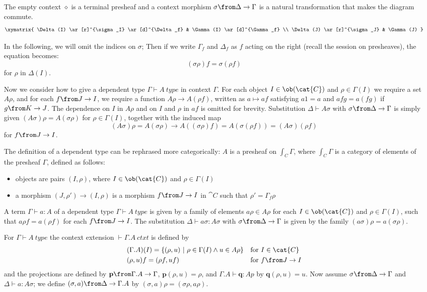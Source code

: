 The empty context $\diamond$ is a terminal presheaf and a context morphism
$\sigma \from \Delta \to \Gamma$ is a natural transformation that makes the
diagram commute.
\[
  \xymatrix{
    \Delta(I) \ar[r]^{\sigma_I} \ar[d]^{\Delta_f} & \Gamma(I) \ar[d]^{\Gamma_f} \\
    \Delta(J) \ar[r]^{\sigma_J} & \Gamma(J)
  }
\]

In the following, we will omit the indices on $\sigma$; Then if we write
$\Gamma_f$ and $\Delta_f$ as $f$ acting on the right (recall the session on
presheaves), the equation becomes:
\[
  (\sigma \rho) f = \sigma (\rho f)
\]
for $\rho$ in $\Delta(I)$.

Now we consider how to give a dependent type $\Gamma \vdash A~type$ in context
$\Gamma$. For each object $I \in \ob(\cat{C})$ and $\rho \in \Gamma(I)$ we require a
set $A \rho$, and for each $f \from J \to I$, we require a function $A \rho \to
A (\rho f)$, written as $a \mapsto af$ satisfying $a1 = a$ and $afg = a (f g)$
if $g \from K \to J$. The dependence on $I$ in $A\rho$ and on $I$ and $\rho$ in
$af$ is omitted for brevity. Substitution $\Delta \vdash A \sigma$ with $\sigma
\from \Delta \to \Gamma$ is simply given $(A \sigma) \rho = A (\sigma \rho)$
for $\rho \in \Gamma(I)$, together with the induced map
\[
  (A\sigma)\rho = A (\sigma \rho) \to A ((\sigma \rho)f) = A (\sigma (\rho f)) = (A \sigma) (\rho f)
\]
for $f \from J \to I$.

The definition of a dependent type can be rephrased more categorically: $A$ is
a presheaf on $\int_C \Gamma$, where $\int_C \Gamma$ is a category of elements
of the presheaf $\Gamma$, defined as follows:
\begin{itemize}
  \item objects are pairs $(I, \rho)$, where $I \in \ob(\cat{C})$ and $\rho \in
    \Gamma(I)$
  \item a morphism $(J, \rho') \to (I, \rho)$ is a morphism $f \from J \to I$
    in $\cat{C}$ such that $\rho' = \Gamma_f \rho$
\end{itemize}

A term $\Gamma \vdash a : A$ of a dependent type $\Gamma \vdash A~type$ is
given by a family of elements $a \rho \in A \rho$ for each $I \in \ob(\cat{C})$
and $\rho \in \Gamma(I)$, such that $a \rho f = a (\rho f)$ for each $f \from J
\to I$. The substitution $\Delta \vdash a \sigma : A \sigma$ with $\sigma \from
\Delta \to \Gamma$ is given by the family $(a \sigma) \rho = a (\sigma \rho)$.

For $\Gamma \vdash A~type$ the context extension $\vdash \Gamma.A~ctxt$ is
defined by
\begin{align*}
  &(\Gamma.A)(I) = \{(\rho, u)~|~\rho \in \Gamma(I) \land u \in A \rho\} &&
  \text{for $I \in \cat{C}$}\\
  &(\rho, u)f = (\rho f, u f) && \text{for $f \from J \to I$}
\end{align*}
and the projections are defined by $\mathbf{p} \from \Gamma.A \to \Gamma$,
$\mathbf{p}(\rho, u) = \rho$, and $\Gamma.A \vdash \mathbf{q} : Ap$ by
$\mathbf{q}(\rho, u) = u$.  Now assume $\sigma \from \Delta \to \Gamma$ and
$\Delta \vdash a : A\sigma$; we define $(\sigma, a) \from \Delta \to \Gamma.A$
by $(\sigma, a)\rho = (\sigma \rho, a \rho)$.

